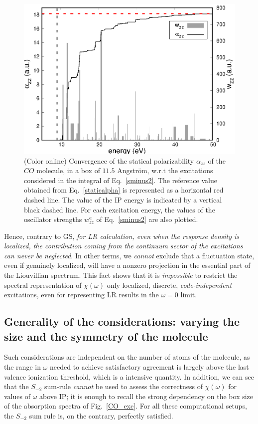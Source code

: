 \documentclass[reprint,aps,prb]{revtex4-1}
\renewcommand{\AA}{{Angstr\"om}}
\begin{document}
\begin{figure}
\includegraphics[scale=0.6]{Fig6_CO_statPolvsExc.eps}
\caption{\label{co_AlphaExc}(Color online) Convergence of the statical polarizability $\alpha_{zz}$ of the $CO$ molecule, in a box of $11.5$ \AA,
w.r.t the excitations considered in the integral of Eq.~\eqref{sminus2}. The reference value obtained from Eq.~\eqref{staticalpha} is represented as a
horizontal red dashed line. The value of the IP energy is indicated by a vertical black dashed line. For each excitation energy, the values of the
oscillator strengths $w^a_{zz}$ of Eq.~\eqref{sminus2} are also plotted. }
\end{figure}
Hence, contrary to GS, \emph{for LR calculation,
even when the response density is localized, the contribution coming from the
continuum sector of the excitations can never be neglected}.
In other terms, we \emph{cannot} exclude that a fluctuation state, even if genuinely localized, will have a nonzero projection
in the essential part of the Liouvillian spectrum.
This fact shows that it is \emph{impossible} to restrict the spectral representation
of $\chi(\omega)$ only localized, discrete, \emph{code-independent} excitations, even for representing LR results in the $\omega=0$ limit.

\subsection{Generality of the considerations: varying the size and the symmetry of the molecule}


Such considerations are independent on the number of atoms of the molecule, as the range in $\omega$ needed to
achieve satisfactory agreement is largely above the last valence ionization threshold, which is
a intensive quantity.
In addition, we can see that the $S_{-2}$ sum-rule \emph{cannot} be used to assess
the correctness of $\chi(\omega)$ for values of $\omega$ above IP; it is enough to recall
the strong dependency on the box size of the absorption spectra of Fig.~\ref{CO_exc}.
For all these computational setups, the $S_{-2}$ sum rule is, on the contrary, perfectly satisfied.
\end{document}
